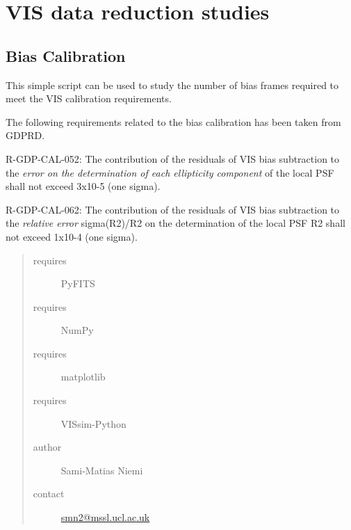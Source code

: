 \documentclass[a4paper,12pt,english]{sphinxmanual}
\begin{document}
\section{VIS data reduction studies}
\label{reduction:vis-data-reduction-studies}\label{reduction:module-analysis.biasCalibration}

\subsection{Bias Calibration}
\label{reduction:bias-calibration}
This simple script can be used to study the number of bias frames required to meet the VIS calibration requirements.

The following requirements related to the bias calibration has been taken from GDPRD.

R-GDP-CAL-052:
The contribution of the residuals of VIS bias subtraction to the \emph{error on the determination of each ellipticity
component} of the local PSF shall not exceed 3x10-5 (one sigma).

R-GDP-CAL-062:
The contribution of the residuals of VIS bias subtraction to the \emph{relative error} sigma(R2)/R2 on the determination of
the local PSF R2 shall not exceed 1x10-4 (one sigma).
\begin{quote}\begin{description}
\item[{requires}] \leavevmode
PyFITS

\item[{requires}] \leavevmode
NumPy

\item[{requires}] \leavevmode
matplotlib

\item[{requires}] \leavevmode
VISsim-Python

\item[{author}] \leavevmode
Sami-Matias Niemi

\item[{contact}] \leavevmode
\href{mailto:smn2@mssl.ucl.ac.uk}{smn2@mssl.ucl.ac.uk}

\end{description}\end{quote}
\end{document}
